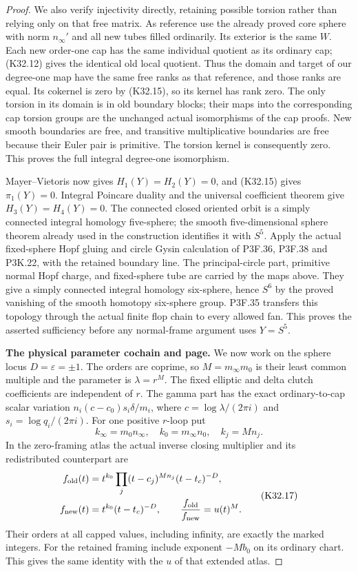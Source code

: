 \begin{proof}
We also verify injectivity directly, retaining possible
torsion rather than relying only on that free matrix.
As reference use the already proved core sphere with
norm $n_\infty'$ and all new tubes filled ordinarily.
Its exterior is the same $W$. Each new order-one cap
has the same individual quotient as its ordinary cap;
(K32.12) gives the identical old local quotient.
Thus the domain and target of our degree-one map have
the same free ranks as that reference, and those ranks
are equal. Its cokernel is zero by (K32.15), so its
kernel has rank zero. The only torsion in its domain
is in old boundary blocks; their maps into the
corresponding cap torsion groups are the unchanged
actual isomorphisms of the cap proofs. New smooth
boundaries are free, and transitive multiplicative
boundaries are free because their Euler pair is
primitive. The torsion kernel is consequently zero.
This proves the full integral degree-one isomorphism.

Mayer--Vietoris now gives $H_1(Y)=H_2(Y)=0$, and
(K32.15) gives $\pi_1(Y)=0$. Integral Poincare duality
and the universal coefficient theorem give
$H_3(Y)=H_4(Y)=0$. The connected closed oriented orbit
is a simply connected integral homology five-sphere;
the smooth five-dimensional sphere theorem already
used in the construction identifies it with $S^5$.
Apply the actual fixed-sphere Hopf gluing and circle
Gysin calculation of P3F.36, P3F.38 and P3K.22, with
the retained boundary line. The principal-circle part,
primitive normal Hopf charge, and fixed-sphere tube
are carried by the maps above. They give a simply
connected integral homology six-sphere, hence $S^6$
by the proved vanishing of the smooth homotopy
six-sphere group. P3F.35 transfers this topology
through the actual finite flop chain to every
allowed fan. This proves the asserted sufficiency
before any normal-frame argument uses $Y=S^5$.

\par\medskip\noindent\textbf{The physical parameter cochain and page.}
We now work on the sphere locus $D=\varepsilon=\pm1$.
The orders are coprime, so $M=m_\infty m_0$ is their
least common multiple and the parameter is
$\lambda=r^M$. The fixed elliptic and delta clutch
coefficients are independent of $r$. The gamma part
has the exact ordinary-to-cap scalar variation
$n_i(c-c_0)s_i\delta/m_i$, where
$c=\log\lambda/(2\pi i)$ and $s_i=\log q_i/(2\pi i)$.
For one positive $r$-loop put
\[
 k_\infty=m_0n_\infty,\quad
 k_0=m_\infty n_0,\quad k_j=Mn_j.
\]
In the zero-framing atlas the actual inverse closing
multiplier and its redistributed counterpart are
\[
 \begin{split}
 f_{\rm old}(t)
   &=t^{k_0}\prod_j(t-c_j)^{Mn_j}(t-t_c)^{-D},\\
 f_{\rm new}(t)&=t^{k_0}(t-t_c)^{-D},\qquad
 \frac{f_{\rm old}}{f_{\rm new}}=u(t)^M.                
 \end{split}\tag{K32.17}
\]
Their orders at all capped values, including infinity,
are exactly the marked integers. For the retained
framing include exponent $-Mb_0$ on its ordinary
chart. This gives the same identity with the $u$
of that extended atlas.


\end{proof}
